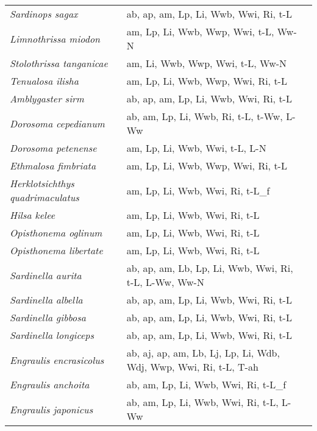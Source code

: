 {\begin{longtable}[c]{p{3.5cm}p{5.5cm}p{5.5cm}}
\emph{Sardinops sagax} &  ab, ap, am, Lp, Li, Wwb, Wwi, Ri, t-L & \citet{QuinNeva2000} \\
\emph{Limnothrissa miodon} &  am, Lp, Li, Wwb, Wwp, Wwi, t-L, Ww-N & \citet{Kimu1995,Pete1999} \\
\emph{Stolothrissa tanganicae} &  am, Li, Wwb, Wwp, Wwi, t-L, Ww-N & \citet{Kimu1995,Pete1999} \\
\emph{Tenualosa ilisha} &  am, Lp, Li, Wwb, Wwp, Wwi, Ri, t-L & \citet{MaraEska2016,AminArsh2005,AlmuJasi2016,RahmCowx2006} \\
\emph{Amblygaster sirm} &  ab, ap, am, Lp, Li, Wwb, Wwi, Ri, t-L & \citet{DayaGjos1986} \\
\emph{Dorosoma cepedianum} &  ab, am, Lp, Li, Wwb, Ri, t-L, t-Ww, L-Ww & \citet{WallYeag1990,Bodo1964} \\
\emph{Dorosoma petenense} &  am, Lp, Li, Wwb, Wwi, t-L, L-N & \citet{John1970,John1971} \\
\emph{Ethmalosa fimbriata} &  am, Lp, Li, Wwb, Wwp, Wwi, Ri, t-L & \citet{Mose1988} \\
\emph{Herklotsichthys quadrimaculatus} &  am, Lp, Li, Wwb, Wwi, Ri, t-L\_f & \citet{MiltBlab1993,ShirWata2007} \\
\emph{Hilsa kelee} &  am, Lp, Li, Wwb, Wwi, Ri, t-L & \citet{PanhLiub2013} \\
\emph{Opisthonema oglinum} &  am, Lp, Li, Wwb, Wwi, Ri, t-L & \citet{VegaMexi1997} \\
\emph{Opisthonema libertate} &  am, Lp, Li, Wwb, Wwi, Ri, t-L & \citet{RuizQuin2018} \\
\emph{Sardinella aurita} &  ab, ap, am, Lb, Lp, Li, Wwb, Wwi, Ri, t-L, L-Ww, Ww-N & \citet{Hour2015,TsikAnto2006} \\
\emph{Sardinella albella} &  ab, ap, am, Lp, Li, Wwb, Wwi, Ri, t-L & \citet{DayaGjos1986} \\
\emph{Sardinella gibbosa} &  ab, ap, am, Lp, Li, Wwb, Wwi, Ri, t-L & \citet{DayaGjos1986} \\
\emph{Sardinella longiceps} &  ab, ap, am, Lp, Li, Wwb, Wwi, Ri, t-L & \citet{DayaGjos1986} \\
\emph{Engraulis encrasicolus} &  ab, aj, ap, am, Lb, Lj, Lp, Li, Wdb, Wdj, Wwp, Wwi, Ri, t-L, T-ah & \citet{GarrSaiz2012,Re1996,PecqPeti2009,Pecq2008,CataFolk2010,Regn1996} \\
\emph{Engraulis anchoita} &  ab, am, Lp, Li, Wwb, Wwi, Ri, t-L\_f & \citet{Ciec2013,CastCast2003,CarvCast2013} \\
\emph{Engraulis japonicus} &  ab, am, Lp, Li, Wwb, Wwi, Ri, t-L, L-Ww & \citet{Fuku1983,FukuTaka1988} \\

\end{longtable}}

